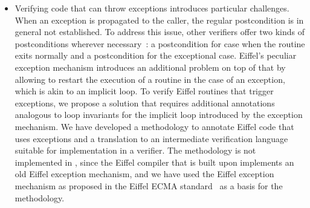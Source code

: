 \begin{itemize}
\item
Verifying code that can throw exceptions introduces particular challenges.
When an exception is propagated to the caller, the regular postcondition is in general not established.
To address this issue, other verifiers offer two kinds of postconditions wherever necessary~\cite{MARCHE05,COK11}: a postcondition for case when the routine exits normally and a postcondition for the exceptional case.
Eiffel's peculiar exception mechanism introduces an additional problem on top of that by allowing to restart the execution of a routine in the case of an exception, which is akin to an implicit loop.
To verify Eiffel routines that trigger exceptions, we propose a solution that requires additional annotations analogous to loop invariants for the implicit loop introduced by the exception mechanism.
We have developed a methodology to annotate Eiffel code that uses exceptions and a translation to an intermediate verification language suitable for implementation in a verifier.
The methodology is not implemented in \AutoProof, since the Eiffel compiler that \AutoProof is built upon implements an old Eiffel exception mechanism, and we have used the Eiffel exception mechanism as proposed in the Eiffel ECMA standard~\cite{ECMA367} as a basis for the methodology.

\end{itemize}


